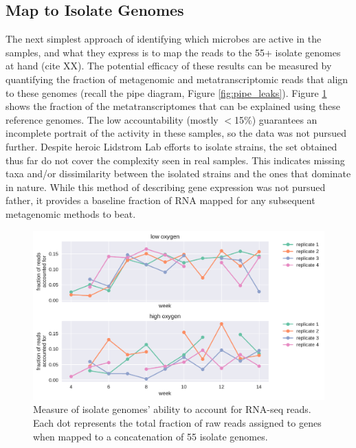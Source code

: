 \subsection{Map to Isolate Genomes}

The next simplest approach of identifying which microbes are active in the samples, and what they express is to map the reads to the 55+ isolate genomes at hand (cite XX).
The potential efficacy of these results can be measured by quantifying the fraction of metagenomic and metatranscriptomic reads that align to these genomes (recall the pipe diagram, Figure \ref{fig:pipe_leaks}).
Figure \ref{fig:isolate_RNAseq} shows the fraction of the metatranscriptomes that can be explained using these reference genomes.
The low accountability (mostly $<$15\%) guarantees an incomplete portrait of the activity in these samples, so the data was not pursued further.
Despite heroic Lidstrom Lab efforts to isolate strains, the set obtained thus far do not cover the complexity seen in real samples.
This indicates missing taxa and/or dissimilarity between the isolated strains and the ones that dominate in nature.
While this method of describing gene expression was not pursued father, it provides a baseline fraction of RNA mapped for any subsequent metagenomic methods to beat.


\begin{figure}[H]
\centering
    \includegraphics[width=1.0\textwidth]{./tex/chapter2/figures/170208_fraction_of_transcriptome_reads_mapped_to_isolates.pdf}
    \begin{singlespace}
    \caption[Measure of isolate genomes' ability to account for RNA-seq reads]{
        Measure of isolate genomes' ability to account for RNA-seq reads.
        Each dot represents the total fraction of raw reads assigned to genes when mapped to a concatenation of 55 isolate genomes.
        }
    \label{fig:isolate_RNAseq}
    \end{singlespace}
\end{figure}

